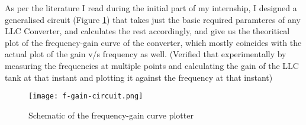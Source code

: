 As per the literature I read during the initial part of my internship, I designed a generalised circuit (Figure \ref{fig:f-gain-circuit}) that takes just the basic required paramteres of any LLC Converter, and calculates the rest accordingly, and give us the theoritical plot of the frequency-gain curve of the converter, which mostly coincides with the actual plot of the gain v/s frequency as well. (Verified that experimentally by measuring the frequencies at multiple points and calculating the gain of the LLC tank at that instant and plotting it against the frequency at that instant)
\begin{figure}[H]
    \centering
    \texttt{[image: f-gain-circuit.png]}
    \caption{Schematic of the frequency-gain curve plotter}
    \label{fig:f-gain-circuit}
\end{figure}

